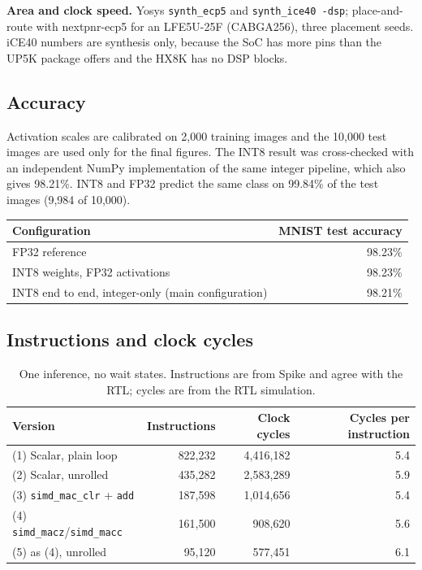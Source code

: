 \documentclass[10pt,a4paper]{article}
\newcommand{\simd}[1]{\texttt{simd\_#1}}
\begin{document}
\textbf{Area and clock speed.} Yosys \texttt{synth\_ecp5} and \texttt{synth\_ice40 -dsp}; place-and-route with nextpnr-ecp5 for an LFE5U-25F (CABGA256), three placement seeds. iCE40 numbers are synthesis only, because the SoC has more pins than the UP5K package offers and the HX8K has no DSP blocks.

\subsection{Accuracy}
Activation scales are calibrated on 2,000 training images and the 10,000 test images are used only for the final figures. The INT8 result was cross-checked with an independent NumPy implementation of the same integer pipeline, which also gives 98.21\%. INT8 and FP32 predict the same class on 99.84\% of the test images (9,984 of 10,000).

\begin{center}
\begin{tabular}{@{}lr@{}}
\toprule
Configuration & MNIST test accuracy \\
\midrule
FP32 reference & 98.23\% \\
INT8 weights, FP32 activations & 98.23\% \\
INT8 end to end, integer-only (main configuration) & 98.21\% \\
\bottomrule
\end{tabular}
\end{center}

\subsection{Instructions and clock cycles}
\begin{table}[htbp]
\centering
\caption{One inference, no wait states. Instructions are from Spike and agree with the RTL; cycles are from the RTL simulation.}
\label{tab:cycles}
\small
\begin{tabular}{@{}lrrr@{}}
\toprule
Version & Instructions & Clock cycles & Cycles per instruction \\
\midrule
(1) Scalar, plain loop & 822,232 & 4,416,182 & 5.4 \\
(2) Scalar, unrolled & 435,282 & 2,583,289 & 5.9 \\
(3) \simd{mac\_clr} + \texttt{add} & 187,598 & 1,014,656 & 5.4 \\
(4) \simd{macz}/\simd{macc} & 161,500 & 908,620 & 5.6 \\
(5) as (4), unrolled & 95,120 & 577,451 & 6.1 \\
\bottomrule
\end{tabular}
\end{table}
\end{document}
